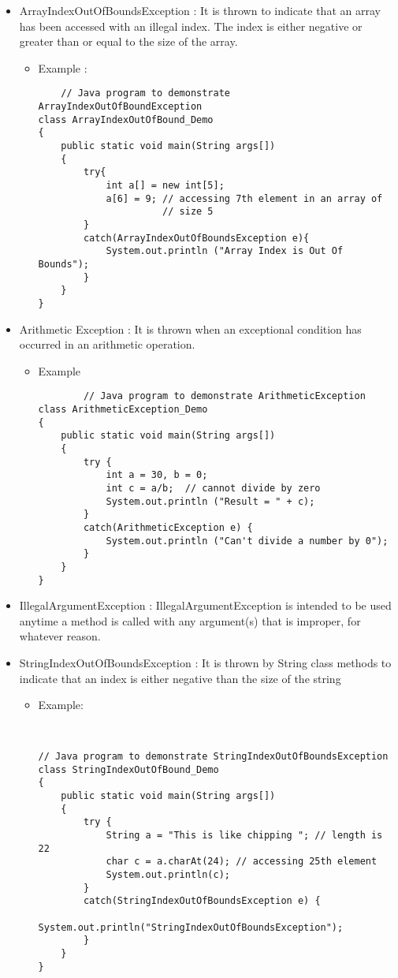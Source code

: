 \documentclass{article}
\begin{document}
\begin{itemize}
\item ArrayIndexOutOfBoundsException : It is thrown to indicate that an array has been accessed with an illegal index. The index is either negative or greater than or equal to the size of the array.
\begin{itemize}
    \item Example :
    \begin{lstlisting}
    // Java program to demonstrate ArrayIndexOutOfBoundException 
class ArrayIndexOutOfBound_Demo 
{ 
    public static void main(String args[]) 
    { 
        try{ 
            int a[] = new int[5]; 
            a[6] = 9; // accessing 7th element in an array of 
                      // size 5 
        } 
        catch(ArrayIndexOutOfBoundsException e){ 
            System.out.println ("Array Index is Out Of Bounds"); 
        } 
    } 
} 
    \end{lstlisting}
\end{itemize}
\item Arithmetic Exception : It is thrown when an exceptional condition has occurred in an arithmetic operation.
    \begin{itemize}
        \item Example
        \begin{lstlisting}
        // Java program to demonstrate ArithmeticException 
class ArithmeticException_Demo 
{ 
    public static void main(String args[]) 
    { 
        try { 
            int a = 30, b = 0; 
            int c = a/b;  // cannot divide by zero 
            System.out.println ("Result = " + c); 
        } 
        catch(ArithmeticException e) { 
            System.out.println ("Can't divide a number by 0"); 
        } 
    } 
}
        \end{lstlisting}
    \end{itemize}
\item IllegalArgumentException : IllegalArgumentException is intended to be used anytime a method is called with any argument(s) that is improper, for whatever reason.
\item StringIndexOutOfBoundsException : It is thrown by String class methods to indicate that an index is either negative than the size of the string
    \begin{itemize}
        \item Example:
        \begin{lstlisting}
        
        
// Java program to demonstrate StringIndexOutOfBoundsException 
class StringIndexOutOfBound_Demo 
{ 
    public static void main(String args[]) 
    { 
        try { 
            String a = "This is like chipping "; // length is 22 
            char c = a.charAt(24); // accessing 25th element 
            System.out.println(c); 
        } 
        catch(StringIndexOutOfBoundsException e) { 
            System.out.println("StringIndexOutOfBoundsException"); 
        } 
    } 
} 
        

\end{lstlisting}
\end{itemize}
\end{itemize}
\end{document}

